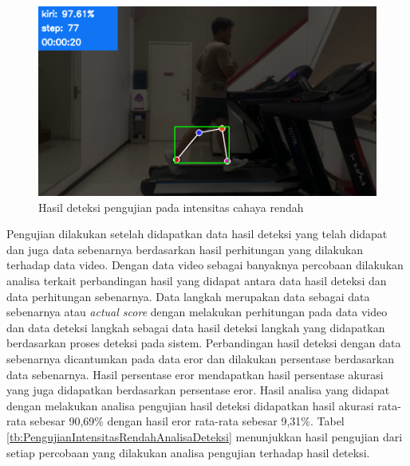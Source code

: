 \begin{figure}[H]
  \centering
  \includegraphics[scale=0.5]{gambar/cahaya_rendah2.png}
  \caption{Hasil deteksi pengujian pada intensitas cahaya rendah}
  \label{fig:PengujianIntensitasRendah2}
\end{figure}

Pengujian dilakukan setelah didapatkan data hasil deteksi yang telah didapat dan juga data sebenarnya berdasarkan hasil perhitungan yang dilakukan terhadap data video. Dengan data video sebagai banyaknya percobaan dilakukan analisa terkait perbandingan hasil yang didapat antara data hasil deteksi dan data perhitungan sebenarnya. Data langkah merupakan data sebagai data sebenarnya atau \emph{actual score} dengan melakukan perhitungan pada data video dan data deteksi langkah sebagai data hasil deteksi langkah yang didapatkan berdasarkan proses deteksi pada sistem. Perbandingan hasil deteksi dengan data sebenarnya dicantumkan pada data eror dan dilakukan persentase berdasarkan data sebenarnya. Hasil persentase eror mendapatkan hasil persentase akurasi yang juga didapatkan berdasarkan persentase eror. Hasil analisa yang didapat dengan melakukan analisa pengujian hasil deteksi didapatkan hasil akurasi rata-rata sebesar 90,69\% dengan hasil eror rata-rata sebesar 9,31\%. Tabel \ref{tb:PengujianIntensitasRendahAnalisaDeteksi} menunjukkan hasil pengujian dari setiap percobaan yang dilakukan analisa pengujian terhadap hasil deteksi.

